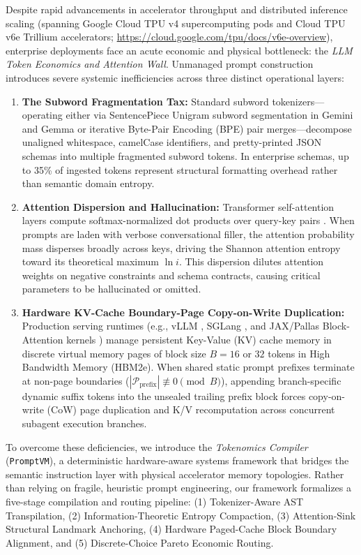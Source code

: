 \documentclass[conference,10pt]{IEEEtran}
\begin{document}
Despite rapid advancements in accelerator throughput and distributed inference scaling \cite{jouppi2023tpu, pope2023efficiently} (spanning Google Cloud TPU v4 supercomputing pods \cite{jouppi2023tpu} and Cloud TPU v6e Trillium accelerators; \url{https://cloud.google.com/tpu/docs/v6e-overview}), enterprise deployments face an acute economic and physical bottleneck: the \textit{LLM Token Economics and Attention Wall}. Unmanaged prompt construction introduces severe systemic inefficiencies across three distinct operational layers:
\begin{enumerate}
    \item \textbf{The Subword Fragmentation Tax:} Standard subword tokenizers---operating either via SentencePiece Unigram subword segmentation in Gemini and Gemma \cite{kudo2018unigram, gemini2024, gemma2_2024} or iterative Byte-Pair Encoding (BPE) pair merges---decompose unaligned whitespace, camelCase identifiers, and pretty-printed JSON schemas \cite{bray2017rfc8259} into multiple fragmented subword tokens. In enterprise schemas, up to 35\% of ingested tokens represent structural formatting overhead rather than semantic domain entropy.
    \item \textbf{Attention Dispersion and Hallucination:} Transformer self-attention layers compute softmax-normalized dot products over query-key pairs \cite{vaswani2017attention}. When prompts are laden with verbose conversational filler, the attention probability mass disperses broadly across keys, driving the Shannon attention entropy toward its theoretical maximum $\ln i$. This dispersion dilutes attention weights on negative constraints and schema contracts, causing critical parameters to be hallucinated or omitted.
    \item \textbf{Hardware KV-Cache Boundary-Page Copy-on-Write Duplication:} Production serving runtimes (e.g., vLLM \cite{kwon2023vllm}, SGLang \cite{zheng2024sglang}, and JAX/Pallas Block-Attention kernels \cite{bradbury2018jax}) manage persistent Key-Value (KV) cache memory in discrete virtual memory pages of block size $B = 16$ or $32$ tokens in High Bandwidth Memory (HBM2e). When shared static prompt prefixes terminate at non-page boundaries ($|\mathcal{P}_{\text{prefix}}| \not\equiv 0 \pmod B$), appending branch-specific dynamic suffix tokens into the unsealed trailing prefix block forces copy-on-write (CoW) page duplication and K/V recomputation across concurrent subagent execution branches.
\end{enumerate}

To overcome these deficiencies, we introduce the \textit{Tokenomics Compiler} (\texttt{PromptVM}), a deterministic hardware-aware systems framework that bridges the semantic instruction layer with physical accelerator memory topologies. Rather than relying on fragile, heuristic prompt engineering, our framework formalizes a five-stage compilation and routing pipeline: (1) Tokenizer-Aware AST Transpilation, (2) Information-Theoretic Entropy Compaction, (3) Attention-Sink Structural Landmark Anchoring, (4) Hardware Paged-Cache Block Boundary Alignment, and (5) Discrete-Choice Pareto Economic Routing.
\end{document}
